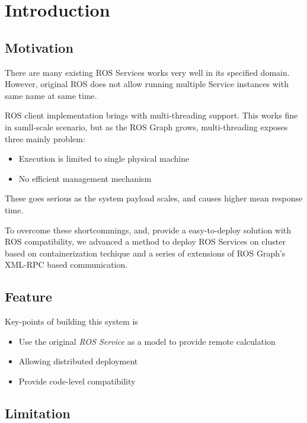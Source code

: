 \section{Introduction}

\subsection{Motivation}

There are many existing ROS Services works very well in its specified domain.
However, original ROS does not allow running multiple Service instances with
same name at same time. 

ROS client implementation brings with multi-threading support. This works fine
in samll-scale scenario, but as the ROS Graph grows, multi-threading exposes
three mainly problem:

\begin{itemize}
    \item Execution is limited to single physical machine
    \item No efficient management mechanism
\end{itemize}

These goes serious as the system payload scales, and causes higher mean response time.

To overcome these shortcommings, and, provide a easy-to-deploy solution with 
ROS compatibility, we advanced a method to deploy ROS Services on cluster based
on containerization techique and a series of extensions of ROS Graph's XML-RPC based
communication.

\subsection{Feature}

Key-points of building this system is

\begin{itemize}
    \item Use the original \emph{ROS Service} as a model to provide remote calculation
    \item Allowing distributed deployment
    \item Provide code-level compatibility
\end{itemize}

\subsection{Limitation}

